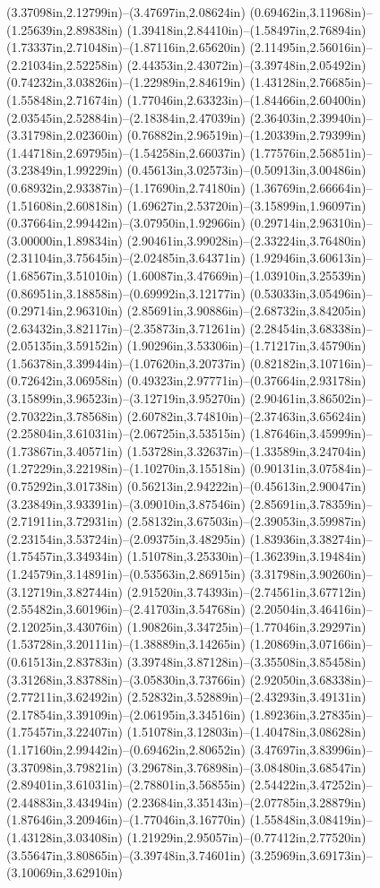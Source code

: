 (3.37098in,2.12799in)--(3.47697in,2.08624in) (0.69462in,3.11968in)--(1.25639in,2.89838in) (1.39418in,2.84410in)--(1.58497in,2.76894in) (1.73337in,2.71048in)--(1.87116in,2.65620in) (2.11495in,2.56016in)--(2.21034in,2.52258in) (2.44353in,2.43072in)--(3.39748in,2.05492in) (0.74232in,3.03826in)--(1.22989in,2.84619in) (1.43128in,2.76685in)--(1.55848in,2.71674in) (1.77046in,2.63323in)--(1.84466in,2.60400in) (2.03545in,2.52884in)--(2.18384in,2.47039in) (2.36403in,2.39940in)--(3.31798in,2.02360in) (0.76882in,2.96519in)--(1.20339in,2.79399in) (1.44718in,2.69795in)--(1.54258in,2.66037in) (1.77576in,2.56851in)--(3.23849in,1.99229in) (0.45613in,3.02573in)--(0.50913in,3.00486in) (0.68932in,2.93387in)--(1.17690in,2.74180in) (1.36769in,2.66664in)--(1.51608in,2.60818in) (1.69627in,2.53720in)--(3.15899in,1.96097in) (0.37664in,2.99442in)--(3.07950in,1.92966in) (0.29714in,2.96310in)--(3.00000in,1.89834in) (2.90461in,3.99028in)--(2.33224in,3.76480in) (2.31104in,3.75645in)--(2.02485in,3.64371in) (1.92946in,3.60613in)--(1.68567in,3.51010in) (1.60087in,3.47669in)--(1.03910in,3.25539in) (0.86951in,3.18858in)--(0.69992in,3.12177in) (0.53033in,3.05496in)--(0.29714in,2.96310in) (2.85691in,3.90886in)--(2.68732in,3.84205in) (2.63432in,3.82117in)--(2.35873in,3.71261in) (2.28454in,3.68338in)--(2.05135in,3.59152in) (1.90296in,3.53306in)--(1.71217in,3.45790in) (1.56378in,3.39944in)--(1.07620in,3.20737in) (0.82182in,3.10716in)--(0.72642in,3.06958in) (0.49323in,2.97771in)--(0.37664in,2.93178in) (3.15899in,3.96523in)--(3.12719in,3.95270in) (2.90461in,3.86502in)--(2.70322in,3.78568in) (2.60782in,3.74810in)--(2.37463in,3.65624in) (2.25804in,3.61031in)--(2.06725in,3.53515in) (1.87646in,3.45999in)--(1.73867in,3.40571in) (1.53728in,3.32637in)--(1.33589in,3.24704in) (1.27229in,3.22198in)--(1.10270in,3.15518in) (0.90131in,3.07584in)--(0.75292in,3.01738in) (0.56213in,2.94222in)--(0.45613in,2.90047in) (3.23849in,3.93391in)--(3.09010in,3.87546in) (2.85691in,3.78359in)--(2.71911in,3.72931in) (2.58132in,3.67503in)--(2.39053in,3.59987in) (2.23154in,3.53724in)--(2.09375in,3.48295in) (1.83936in,3.38274in)--(1.75457in,3.34934in) (1.51078in,3.25330in)--(1.36239in,3.19484in) (1.24579in,3.14891in)--(0.53563in,2.86915in) (3.31798in,3.90260in)--(3.12719in,3.82744in) (2.91520in,3.74393in)--(2.74561in,3.67712in) (2.55482in,3.60196in)--(2.41703in,3.54768in) (2.20504in,3.46416in)--(2.12025in,3.43076in) (1.90826in,3.34725in)--(1.77046in,3.29297in) (1.53728in,3.20111in)--(1.38889in,3.14265in) (1.20869in,3.07166in)--(0.61513in,2.83783in) (3.39748in,3.87128in)--(3.35508in,3.85458in) (3.31268in,3.83788in)--(3.05830in,3.73766in) (2.92050in,3.68338in)--(2.77211in,3.62492in) (2.52832in,3.52889in)--(2.43293in,3.49131in) (2.17854in,3.39109in)--(2.06195in,3.34516in) (1.89236in,3.27835in)--(1.75457in,3.22407in) (1.51078in,3.12803in)--(1.40478in,3.08628in) (1.17160in,2.99442in)--(0.69462in,2.80652in) (3.47697in,3.83996in)--(3.37098in,3.79821in) (3.29678in,3.76898in)--(3.08480in,3.68547in) (2.89401in,3.61031in)--(2.78801in,3.56855in) (2.54422in,3.47252in)--(2.44883in,3.43494in) (2.23684in,3.35143in)--(2.07785in,3.28879in) (1.87646in,3.20946in)--(1.77046in,3.16770in) (1.55848in,3.08419in)--(1.43128in,3.03408in) (1.21929in,2.95057in)--(0.77412in,2.77520in) (3.55647in,3.80865in)--(3.39748in,3.74601in) (3.25969in,3.69173in)--(3.10069in,3.62910in) 